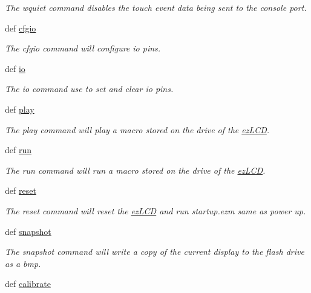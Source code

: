 \begin{DoxyCompactItemize}
\begin{DoxyCompactList}\small\item\em The wquiet command disables the touch event data being sent to the console port. \end{DoxyCompactList}\item 
def \hyperlink{group___general_ga84837123679c1b262b8bb29108019dda}{cfgio}
\begin{DoxyCompactList}\small\item\em The cfgio command will configure io pins. \end{DoxyCompactList}\item 
def \hyperlink{group___general_gad7ece2d1355d0be3f7df9ce216cb5286}{io}
\begin{DoxyCompactList}\small\item\em The io command use to set and clear io pins. \end{DoxyCompactList}\item 
def \hyperlink{group___general_ga7d904406a210cad98e2d762dae76d553}{play}
\begin{DoxyCompactList}\small\item\em The play command will play a macro stored on the drive of the \hyperlink{classmodule_1_1ez_l_c_d3xx_1_1ez_l_c_d}{ez\-L\-C\-D}. \end{DoxyCompactList}\item 
def \hyperlink{group___general_ga0535965cf75c9a6f4f6039a1d1399d81}{run}
\begin{DoxyCompactList}\small\item\em The run command will run a macro stored on the drive of the \hyperlink{classmodule_1_1ez_l_c_d3xx_1_1ez_l_c_d}{ez\-L\-C\-D}. \end{DoxyCompactList}\item 
def \hyperlink{group___general_gad09d3f52045f116eb41726211f8909a4}{reset}
\begin{DoxyCompactList}\small\item\em The reset command will reset the \hyperlink{classmodule_1_1ez_l_c_d3xx_1_1ez_l_c_d}{ez\-L\-C\-D} and run startup.\-ezm same as power up. \end{DoxyCompactList}\item 
def \hyperlink{group___general_gaf906c49e26bdd7b09f58d80675a0d4f5}{snapshot}
\begin{DoxyCompactList}\small\item\em The snapshot command will write a copy of the current display to the flash drive as a bmp. \end{DoxyCompactList}\item 
\hypertarget{group___general_ga44f3daeee41eaaf35752594e6543a619}{def \hyperlink{group___general_ga44f3daeee41eaaf35752594e6543a619}{calibrate}}\label{group___general_ga44f3daeee41eaaf35752594e6543a619}


\end{DoxyCompactItemize}
